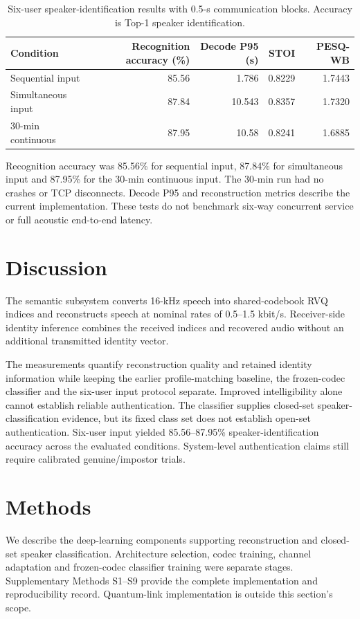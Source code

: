 \documentclass[final,5p,times,twocolumn]{elsarticle}
\begin{document}
\begin{table}[t]
\centering
\caption{Six-user speaker-identification results with 0.5-s communication blocks. Accuracy is Top-1 speaker identification.}
\label{tab:six-user}
\scriptsize\setlength{\tabcolsep}{4pt}
\begin{tabular}{lrrrr}
\toprule
Condition & Recognition accuracy (\%) & Decode P95 (s) & STOI & PESQ-WB\\
\midrule
Sequential input & 85.56 & 1.786 & 0.8229 & 1.7443\\
Simultaneous input & 87.84 & 10.543 & 0.8357 & 1.7320\\
30-min continuous & 87.95 & 10.58 & 0.8241 & 1.6885\\
\bottomrule
\end{tabular}
\end{table}

Recognition accuracy was 85.56\% for sequential input, 87.84\% for simultaneous input and 87.95\% for the 30-min continuous input. The 30-min run had no crashes or TCP disconnects. Decode P95 and reconstruction metrics describe the current implementation. These tests do not benchmark six-way concurrent service or full acoustic end-to-end latency.

\section{Discussion}
The semantic subsystem converts 16-kHz speech into shared-codebook RVQ indices and reconstructs speech at nominal rates of 0.5--1.5 kbit/s. Receiver-side identity inference combines the received indices and recovered audio without an additional transmitted identity vector.

The measurements quantify reconstruction quality and retained identity information while keeping the earlier profile-matching baseline, the frozen-codec classifier and the six-user input protocol separate. Improved intelligibility alone cannot establish reliable authentication. The classifier supplies closed-set speaker-classification evidence, but its fixed class set does not establish open-set authentication. Six-user input yielded 85.56--87.95\% speaker-identification accuracy across the evaluated conditions. System-level authentication claims still require calibrated genuine/impostor trials.


\section{Methods}
\label{sec:methods}
We describe the deep-learning components supporting reconstruction and closed-set speaker classification. Architecture selection, codec training, channel adaptation and frozen-codec classifier training were separate stages. Supplementary Methods S1--S9 provide the complete implementation and reproducibility record. Quantum-link implementation is outside this section's scope.
\end{document}
